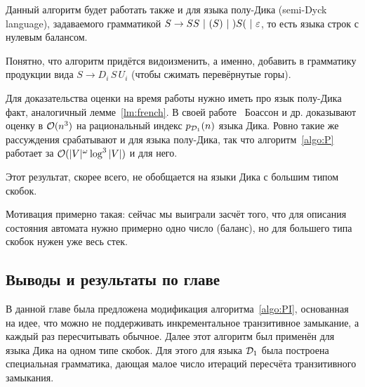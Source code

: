 \begin{note}
  Данный алгоритм будет работать также и для языка полу-Дика (semi-Dyck language), задаваемого грамматикой $S \rightarrow SS ~|~ ( S ) ~|~ ) S ( ~|~ \varepsilon$, то есть языка строк с нулевым балансом.

  Понятно, что алгоритм придётся видоизменить, а именно, добавить в грамматику продукции вида $S \to D_i\, S\, U_i$ (чтобы сжимать перевёрнутые горы). 

  Для доказательства оценки на время работы нужно иметь про язык полу-Дика факт, аналогичный лемме~\ref{lm:french}. В своей работе~\cite{Boasson1981} Боассон и др. доказывают оценку в $\mathcal{O}(n^3)$ на рациональный индекс $p_{\mathcal{D}_1}(n)$ языка Дика. Ровно такие же рассуждения срабатывают и для языка полу-Дика, так что алгоритм~\ref{algo:P} работает за $\mathcal{O}(|V|^{\omega} \log^3 |V|)$ и для него.
\end{note}

\begin{note}
  Этот результат, скорее всего, не обобщается на языки Дика с большим типом скобок. 

  Мотивация примерно такая: сейчас мы выиграли засчёт того, что для описания состояния автомата нужно примерно одно число (баланс), но для большего типа скобок нужен уже весь стек.
\end{note}

\subsection{Выводы и результаты по главе}

В данной главе была предложена модификация алгоритма~\ref{algo:PI}, основанная на идее, что можно не поддерживать инкрементальное транзитивное замыкание, а каждый раз пересчитывать обычное. Далее этот алгоритм был применён для языка Дика на одном типе скобок. Для этого для языка $\mathcal{D}_1$ была построена специальная грамматика, дающая малое число итераций пересчёта транзитивного замыкания.
